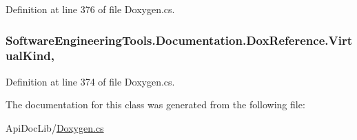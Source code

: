 Definition at line 376 of file Doxygen.\+cs.

\hypertarget{class_software_engineering_tools_1_1_documentation_1_1_dox_reference_a607a1e892b5e0ab21af53d75a6cad17b}{
\subsubsection[{Virtual\+Kind}]{ Software\+Engineering\+Tools.\+Documentation.\+Dox\+Reference.\+Virtual\+Kind\hspace{0.3cm}{\ttfamily [get]}, {\ttfamily [set]}}}\label{class_software_engineering_tools_1_1_documentation_1_1_dox_reference_a607a1e892b5e0ab21af53d75a6cad17b}


Definition at line 374 of file Doxygen.\+cs.



The documentation for this class was generated from the following file\+:\begin{DoxyCompactItemize}
\item 
Api\+Doc\+Lib/\hyperlink{_doxygen_8cs}{Doxygen.\+cs}\end{DoxyCompactItemize}
